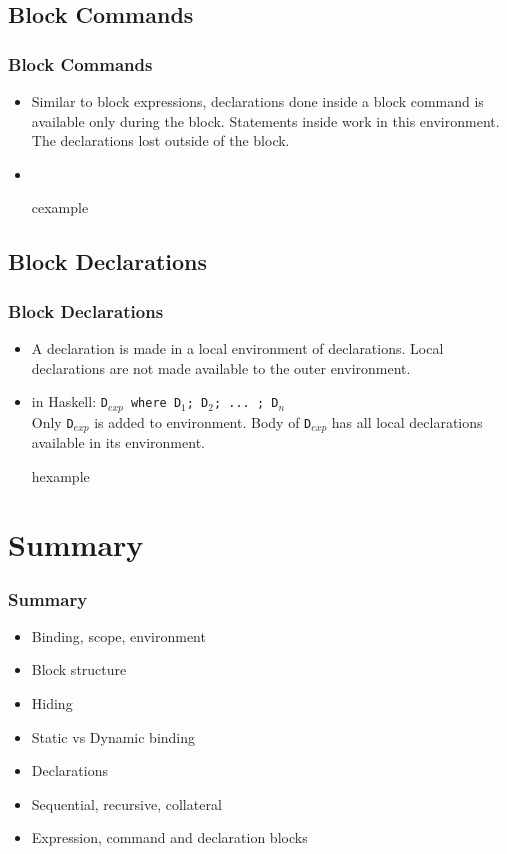 \subsection{Block Commands}
\begin{frame}
\frametitle{Block Commands}
\begin{itemize}
 \item Similar to block expressions, declarations done inside a block command is available only
 during the block. Statements inside work in this environment. The declarations lost outside of
 the block. 
 \item \ \\
\begin{beamercolorbox}{cexample}
\codeblokcomC
\end{beamercolorbox}
\end{itemize}

\end{frame}

\subsection{Block Declarations}
\begin{frame}
\frametitle{Block Declarations}
\begin{itemize}
 \item A declaration is made in a local environment of declarations. Local declarations
 	are not made available to the outer environment.
 \item in Haskell: \texttt{D$_{exp}$ where D$_1$; D$_2$;  ... ; D$_n$}\\
 	Only \texttt{D$_{exp}$} is added to environment. Body of \texttt{D$_{exp}$} has all local
	declarations available in its environment.
\begin{beamercolorbox}{hexample}
 \codeblokdecH
\end{beamercolorbox}
\end{itemize}
\end{frame}

\section{Summary}
\begin{frame}
\frametitle{Summary}
\begin{itemize}
\item Binding, scope, environment
\item Block structure
\item Hiding
\item Static vs Dynamic binding
\item Declarations
\item Sequential, recursive, collateral
\item Expression, command and declaration blocks
\end{itemize}
\end{frame}

